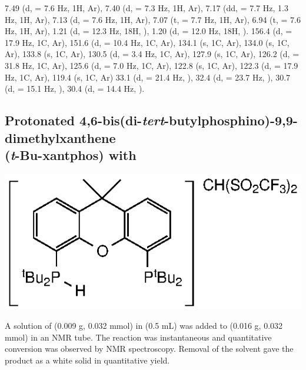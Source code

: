 7.49 (d, \J = 7.6 Hz, 1H, Ar),
7.40 (d, \J = 7.3 Hz, 1H, Ar),
7.17 (dd, \J = 7.7 Hz, 1.3 Hz, 1H, Ar),
7.13 (d, \J = 7.6 Hz, 1H, Ar),
7.07 (t, \J = 7.7 Hz, 1H, Ar),
6.94 (t, \J = 7.6 Hz, 1H, Ar),
1.21 (d, \J = 12.3 Hz, 18H, \StBuiH),
1.20 (d, \J = 12.0 Hz, 18H, \StBuiH).
156.4 (d, \JPC = 17.9 Hz, 1C, Ar),
151.6 (d, \JPC = 10.4 Hz, 1C, Ar),
134.1 (s, 1C, Ar),
134.0 (s, 1C, Ar),
133.8 (s, 1C, Ar),
130.5 (d, \JPC = 3.4 Hz, 1C, Ar),
127.9 (s, 1C, Ar),
126.2 (d, \JPC = 31.8 Hz, 1C, Ar),
125.6 (d, \JPC = 7.0 Hz, 1C, Ar),
122.8 (s, 1C, Ar),
122.3 (d, \JPC = 17.9 Hz, 1C, Ar),
119.4 (s, 1C, Ar)
33.1 (d, \JPC = 21.4 Hz, \StBuhC),
32.4 (d, \JPC = 23.7 Hz, \StBuhC),
30.7 (d, \JPC = 15.1 Hz, \StBuiC),
30.4 (d, \JPC = 14.4 Hz, \StBuiC).

\subsection*{Protonated 4,6-bis(di-\emph{tert}-butylphosphino)-9,9-dimethylxanthene\\(\emph{t}-Bu-xantphos) with }

\begin{structure}[h]
\begin{center}
\includegraphics{../Structures/CtBuH.eps}
\end{center}
\end{structure}

A solution of  (0.009 g, 0.032 mmol) in  (0.5 mL) was added to \tBuxantphos{} (0.016 g, 0.032 mmol)  in an NMR tube.  The reaction was instantaneous and quantitative conversion was observed by NMR spectroscopy.  Removal of the solvent  gave the product as a white solid in quantitative yield.  

